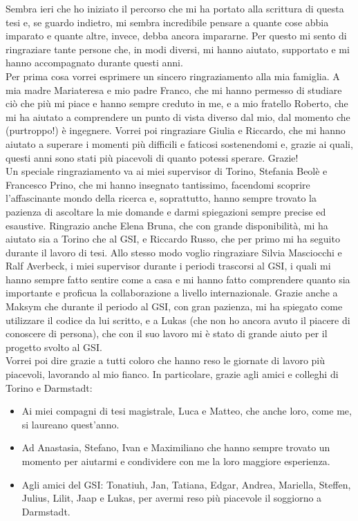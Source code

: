 \documentclass[b5paper,10pt,twoside,oldstyle,classica]{toptesi}
\begin{document}
\ringraziamenti
Sembra ieri che ho iniziato il percorso che mi ha portato alla scrittura di questa tesi e, se guardo indietro, mi sembra incredibile pensare a quante cose abbia imparato e quante altre, invece, debba ancora impararne. Per questo mi sento di ringraziare tante persone che, in modi diversi, mi hanno aiutato, supportato e mi hanno accompagnato durante questi anni. \\
Per prima cosa vorrei esprimere un sincero ringraziamento alla mia famiglia. A mia madre Mariateresa e mio padre Franco, che mi hanno permesso di studiare ci\`{o} che pi\`{u} mi piace e hanno sempre creduto in me, e a mio fratello Roberto, che mi ha aiutato a comprendere un punto di vista diverso dal mio, dal momento che (purtroppo!) \`{e} ingegnere. Vorrei poi ringraziare Giulia e Riccardo, che mi hanno aiutato a superare i momenti pi\`{u} difficili e faticosi sostenendomi e, grazie ai quali, questi anni sono stati pi\`{u} piacevoli di quanto potessi sperare. Grazie!\\
Un speciale ringraziamento va ai miei supervisor di Torino, Stefania Beol\`{e} e Francesco Prino, che mi hanno insegnato tantissimo, facendomi scoprire l'affascinante mondo della ricerca e, soprattutto, hanno sempre trovato la pazienza di ascoltare la mie domande e darmi spiegazioni sempre precise ed esaustive. Ringrazio anche Elena Bruna, che con grande disponibilit\`{a}, mi ha aiutato sia a Torino che al GSI, e Riccardo Russo, che per primo mi ha seguito durante il lavoro di tesi. Allo stesso modo voglio ringraziare Silvia Masciocchi e Ralf Averbeck, i miei supervisor durante i periodi trascorsi al GSI, i quali mi hanno sempre fatto sentire come a casa e mi hanno fatto comprendere quanto sia importante e proficua la collaborazione a livello internazionale. Grazie anche a Maksym che durante il periodo al GSI, con gran pazienza, mi ha spiegato come utilizzare il codice da lui scritto, e a Lukas (che non ho ancora avuto il piacere di conoscere di persona), che con il suo lavoro mi \`{e} stato di grande aiuto per il progetto svolto al GSI. \\Vorrei poi dire grazie a tutti coloro che hanno reso le giornate di lavoro pi\`{u} piacevoli, lavorando al mio fianco. In particolare, grazie agli amici e colleghi di Torino e Darmstadt:
\begin{itemize}
 \item Ai miei compagni di tesi magistrale, Luca e Matteo, che anche loro, come me, si laureano quest'anno.
 \item Ad Anastasia, Stefano, Ivan e Maximiliano che hanno sempre trovato un momento per aiutarmi e condividere con me la loro maggiore esperienza.
 \item Agli amici del GSI: Tonatiuh, Jan, Tatiana, Edgar, Andrea, Mariella, Steffen, Julius, Lilit, Jaap e Lukas, per avermi reso pi\`{u} piacevole il soggiorno a Darmstadt. 
\end{itemize}
\end{document}
